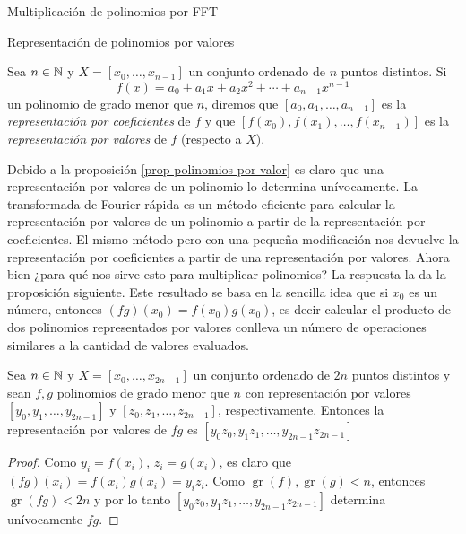\begin{chapter}{Multiplicación de polinomios por FFT}
\begin{section}{Representación de polinomios por valores}
        \begin{definicion} Sea $n \in \mathbb N$ y $X = [x_0,\ldots,x_{n-1}]$  un conjunto ordenado de $n$ puntos distintos. Si 
            $$
            f(x) = a_0 + a_1 x+ a_2 x^2 + \cdots  + a_{n-1}x^{n-1}
            $$
        un polinomio de grado menor que $n$, diremos que $[a_0,a_1,\ldots, a_{n-1}]$  es la \textit{representación por coeficientes} de $f$ y que $[f(x_0),f(x_1),\ldots,f(x_{n-1})]$ es la \textit{representación por valores} de $f$ (respecto a $X$).
        \end{definicion}

        Debido a la proposición \ref{prop-polinomios-por-valor} es claro que una representación por valores de un polinomio lo determina unívocamente. La transformada de Fourier rápida es un método eficiente para calcular la representación por valores de un polinomio a partir de la representación por coeficientes. El mismo método pero con una pequeña modificación nos devuelve la representación por coeficientes a partir  de una representación por valores. Ahora bien ¿para qué nos sirve  esto para multiplicar polinomios? La respuesta la da la proposición siguiente. Este resultado se basa en la sencilla idea que si $x_0$ es un número,  entonces $(fg)(x_0) = f(x_0)g(x_0)$, es decir calcular el producto de dos polinomios representados por valores conlleva un número de operaciones similares a la cantidad de valores evaluados. 
        
        \begin{proposicion}  Sea $n \in \mathbb N$ y $X = [x_0,\ldots,x_{2n-1}]$  un conjunto ordenado de $2n$ puntos distintos y sean $f,g$ polinomios de grado menor que  $n$ con representación  por valores $[y_0,y_1,\ldots,y_{2n-1}]$ y $[z_0,z_1,\ldots,z_{2n-1}]$, respectivamente. Entonces la representación por valores de $fg$ es $[y_0z_0,y_1z_1,\ldots,y_{2n-1}z_{2n-1}]$  
        \end{proposicion}
        \begin{proof}
            Como $y_i = f(x_i)$, $z_i = g(x_i)$,  es claro  que $(fg)(x_i) = f(x_i)g(x_i) = y_iz_i$. Como $\operatorname{gr}(f), \operatorname{gr}(g) < n$,  entonces $\operatorname{gr}(fg) < 2n$ y  por lo tanto $[y_0z_0,y_1z_1,\ldots,y_{2n-1}z_{2n-1}]$ determina unívocamente $fg$. 
        \end{proof}


\end{section}
\end{chapter}
